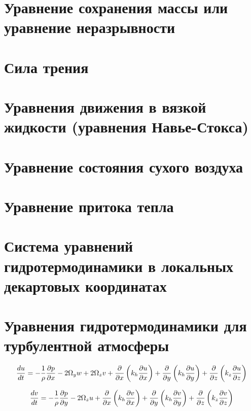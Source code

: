 \section{Уравнение сохранения массы или уравнение неразрывности}

\section{Сила трения}

\section{Уравнения движения в вязкой жидкости (уравнения Навье-Стокса)}

\section{Уравнение состояния сухого воздуха}

\section{Уравнение притока тепла}

\section{Система уравнений гидротермодинамики в локальных декартовых координатах}

\section{Уравнения гидротермодинамики для турбулентной атмосферы}

\begin{equation}
\label{mom_conserv_turb_u}
    \displaystyle\frac{d u}{d t} = -\frac{1}{\rho}\displaystyle\frac{\partial p}{\partial x} - 2\Omega_yw + 2\Omega_zv + 
    \frac{\partial}{\partial x} \left( k_h \displaystyle\frac{\partial u}{\partial x} \right) + 
    \frac{\partial}{\partial y} \left( k_h \displaystyle\frac{\partial u}{\partial y} \right) + 
    \frac{\partial}{\partial z} \left( k_z \displaystyle\frac{\partial u}{\partial z} \right)
\end{equation}

\begin{equation}
\label{mom_conserv_turb_v}
    \displaystyle\frac{d v}{d t} = -\frac{1}{\rho}\displaystyle\frac{\partial p}{\partial y} - 2\Omega_zu +  
    \frac{\partial}{\partial x} \left( k_h \displaystyle\frac{\partial v}{\partial x} \right) + 
    \frac{\partial}{\partial y} \left( k_h \displaystyle\frac{\partial v}{\partial y} \right) + 
    \frac{\partial}{\partial z} \left( k_z \displaystyle\frac{\partial v}{\partial z} \right)
\end{equation}

